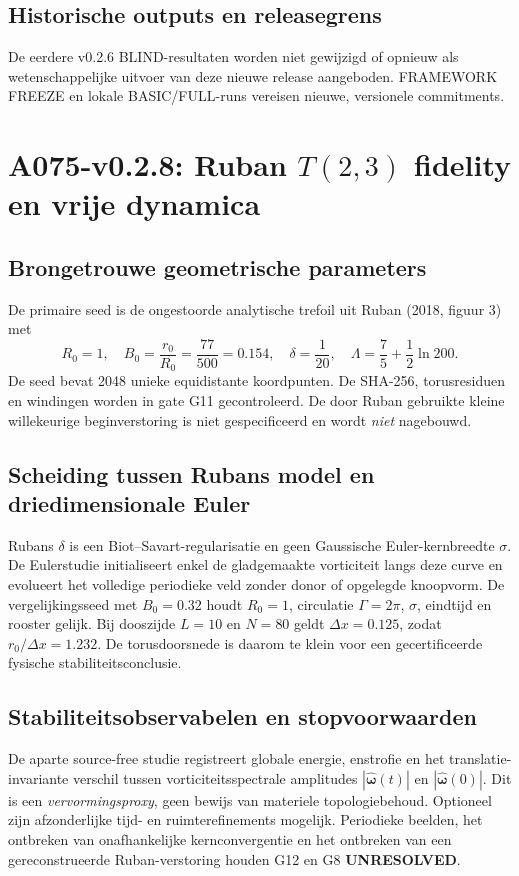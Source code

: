 \documentclass[10pt,a4paper]{article}
\begin{document}
\subsection{Historische outputs en releasegrens}
De eerdere v0.2.6 BLIND-resultaten worden niet gewijzigd of opnieuw als
wetenschappelijke uitvoer van deze nieuwe release aangeboden. FRAMEWORK
FREEZE en lokale BASIC/FULL-runs vereisen nieuwe, versionele commitments.

\section{A075-v0.2.8: Ruban $T(2,3)$ fidelity en vrije dynamica}
\subsection{Brongetrouwe geometrische parameters}
De primaire seed is de ongestoorde analytische trefoil uit Ruban (2018, figuur 3) met
\begin{equation}
R_0=1,\quad B_0=\frac{r_0}{R_0}=\frac{77}{500}=0.154,\quad
\delta=\frac1{20},\quad \Lambda=\frac75+\frac12\ln200.
\end{equation}
De seed bevat 2048 unieke equidistante koordpunten. De SHA-256, torusresiduen en windingen
worden in gate G11 gecontroleerd. De door Ruban gebruikte kleine willekeurige beginverstoring
is niet gespecificeerd en wordt \emph{niet} nagebouwd.
\subsection{Scheiding tussen Rubans model en driedimensionale Euler}
Rubans $\delta$ is een Biot--Savart-regularisatie en geen Gaussische Euler-kernbreedte $\sigma$.
De Eulerstudie initialiseert enkel de gladgemaakte vorticiteit langs deze curve en evolueert
het volledige periodieke veld zonder donor of opgelegde knoopvorm.
De vergelijkingsseed met $B_0=0.32$ houdt $R_0=1$, circulatie $\Gamma=2\pi$, $\sigma$, eindtijd en
rooster gelijk. Bij dooszijde $L=10$ en $N=80$ geldt $\Delta x=0.125$, zodat
$r_0/\Delta x=1.232$. De torusdoorsnede is daarom te klein voor een gecertificeerde
fysische stabiliteitsconclusie.
\subsection{Stabiliteitsobservabelen en stopvoorwaarden}
De aparte source-free studie registreert globale energie, enstrofie en
het translatie-invariante verschil tussen vorticiteitsspectrale amplitudes
$|\widehat{\boldsymbol\omega}(t)|$ en $|\widehat{\boldsymbol\omega}(0)|$.
Dit is een \emph{vervormingsproxy}, geen bewijs van materiele topologiebehoud.
Optioneel zijn afzonderlijke tijd- en ruimterefinements mogelijk. Periodieke beelden,
het ontbreken van onafhankelijke kernconvergentie en het ontbreken van een gereconstrueerde
Ruban-verstoring houden G12 en G8 \textbf{UNRESOLVED}.
\end{document}
